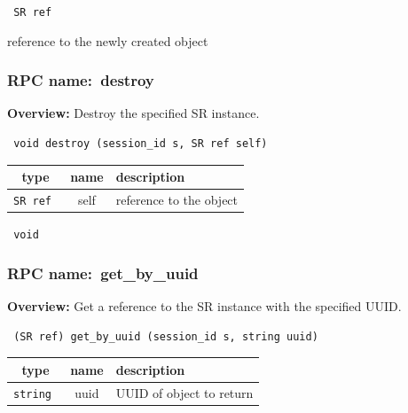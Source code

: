 \vspace{0.3cm}

{\tt 
SR ref
}


reference to the newly created object
\vspace{0.3cm}
\vspace{0.3cm}
\vspace{0.3cm}
\subsubsection{RPC name:~destroy}

{\bf Overview:} 
Destroy the specified SR instance.

\begin{verbatim} void destroy (session_id s, SR ref self)\end{verbatim}



 
\vspace{0.3cm}
\begin{tabular}{|c|c|p{7cm}|}
 \hline
{\bf type} & {\bf name} & {\bf description} \\ \hline
{\tt SR ref } & self & reference to the object \\ \hline 

\end{tabular}

\vspace{0.3cm}

{\tt 
void
}



\vspace{0.3cm}
\vspace{0.3cm}
\vspace{0.3cm}
\subsubsection{RPC name:~get\_by\_uuid}

{\bf Overview:} 
Get a reference to the SR instance with the specified UUID.

\begin{verbatim} (SR ref) get_by_uuid (session_id s, string uuid)\end{verbatim}



 
\vspace{0.3cm}
\begin{tabular}{|c|c|p{7cm}|}
 \hline
{\bf type} & {\bf name} & {\bf description} \\ \hline
{\tt string } & uuid & UUID of object to return \\ \hline 

\end{tabular}

